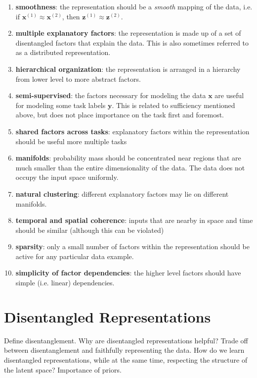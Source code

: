 \begin{enumerate}
	\item \textbf{smoothness}: the representation should be a \textit{smooth} mapping of the data, i.e. if $\mathbf{x}^{(1)} \approx \mathbf{x}^{(2)}$, then $\mathbf{z}^{(1)} \approx \mathbf{z}^{(2)}$.
	\item \textbf{multiple explanatory factors}: the representation is made up of a set of disentangled factors that explain the data. This is also sometimes referred to as a distributed representation.
	\item \textbf{hierarchical organization}: the representation is arranged in a hierarchy from lower level to more abstract factors.
	\item \textbf{semi-supervised}: the factors necessary for modeling the data $\mathbf{x}$ are useful for modeling some task labels $\mathbf{y}$. This is related to sufficiency mentioned above, but does not place importance on the task first and foremost.
	\item \textbf{shared factors across tasks}: explanatory factors within the representation should be useful more multiple tasks
	\item \textbf{manifolds}: probability mass should be concentrated near regions that are much smaller than the entire dimensionality of the data. The data does not occupy the input space uniformly.
	\item \textbf{natural clustering}: different explanatory factors may lie on different manifolds.
	\item \textbf{temporal and spatial coherence}: inputs that are nearby in space and time should be similar (although this can be violated)
	\item \textbf{sparsity}: only a small number of factors within the representation should be active for any particular data example.
	\item \textbf{simplicity of factor dependencies}: the higher level factors should have simple (i.e. linear) dependencies.
\end{enumerate}

\section{Disentangled Representations}

Define disentanglement. Why are disentangled representations helpful? Trade off between disentanglement and faithfully representing the data. How do we learn disentangled representations, while at the same time, respecting the structure of the latent space? Importance of priors.


